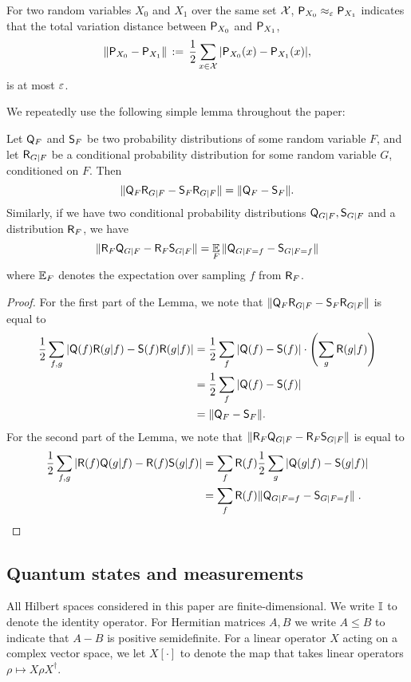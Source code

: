 For two random variables $X_0$ and $X_1$ over the same set $\X$, $\P_{X_0} \approx_\eps \P_{X_1}$ indicates that the total variation distance between $\P_{X_0}$ and $\P_{X_1}$, 
$$\| \P_{X_0} - \P_{X_1} \| \,:=\, \frac{1}{2}\sum_{x \in \X} |\P_{X_0}(x) - \P_{X_1} (x)|,$$
 is at most $\eps$. 

We repeatedly use the following simple lemma throughout the paper:
\begin{lemma}\label{lem:trivial}
Let $\Qsf_F$ and $\Ssf_F$ be two probability distributions of some random variable $F$, and let $\Rsf_{G | F}$ be a conditional probability distribution for some random variable $G$, conditioned on $F$. Then
\[ \| \Qsf_{F} \Rsf_{G|F} - \Ssf_{F} \Rsf_{G|F}\|= \|\Qsf_{F}-\Ssf_{F}\|. \]
Similarly, if we have two conditional probability distributions $\Qsf_{G|F}, \Ssf_{G|F}$ and a distribution $\Rsf_F$, we have
\[
\| \Rsf_F \Qsf_{G|F} - \Rsf_F \Ssf_{G|F} \| = \Ex_F \| \Qsf_{G|F = f} - \Ssf_{G|F=f} \|
\]
where $\Ex_F$ denotes the expectation over sampling $f$ from $\Rsf_F$.
\end{lemma}
\begin{proof}
For the first part of the Lemma, we note that $ \| \Qsf_{F} \Rsf_{G|F} - \Ssf_{F} \Rsf_{G|F}\|$ is equal to
\begin{align*}
 \frac{1}{2}\sum_{f,g} | \Qsf(f) \Rsf(g|f)- \Ssf(f) \Rsf (g|f)|&=  \frac{1}{2}\sum_{f} |\Qsf(f)- \Ssf(f)| \cdot  \left( \sum_{g} \Rsf(g|f)  \right)\\
&= \frac{1}{2}\sum_{f} | \Qsf(f)- \Ssf(f)|\\
&= \|\Qsf_{F}-\Ssf_{F}\|.
\end{align*}
For the second part of the Lemma, we note that $\| \Rsf_F \Qsf_{G|F} - \Rsf_F \Ssf_{G|F} \|$ is equal to
\begin{align*}
\frac{1}{2}\sum_{f,g}	 | \Rsf(f) \Qsf(g|f) - \Rsf(f) \Ssf(g|f) | &= \sum_f \Rsf(f) \frac{1}{2} \sum_g	 | \Qsf(g|f) - \Ssf(g|f) | \\
&= \sum_f \Rsf(f) \| \Qsf_{G|F = f} - \Ssf_{G|F=f} \|\;.
\end{align*}
\end{proof}

\subsection{Quantum states and measurements}
All Hilbert spaces considered in this paper are finite-dimensional. We write $\Id$ to denote the identity operator. For Hermitian matrices $A, B$ we write $A \leq B$ to indicate that $A - B$ is positive semidefinite. For a linear operator $X$ acting on a complex vector space, we let $X[\cdot]$ to denote the map that takes linear operators $\rho \mapsto X\rho X^\dagger$.

